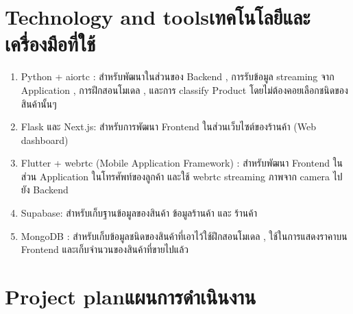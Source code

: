 \section{\ifenglish Technology and tools\else เทคโนโลยีและเครื่องมือที่ใช้\fi}
\begin{enumerate}
    \item Python + aiortc : สำหรับพัฒนาในส่วนของ Backend   , การรับข้อมูล streaming จาก Application   , การฝึกสอนโมเดล , และการ classify Product
    โดยไม่ต้องคอยเลือกชนิดของสินค้านั้นๆ
    \item Flask และ Next.js: สําหรับการพัฒนา Frontend ในส่วนเว็บไซต์ของร้านค้า (Web dashboard)
    \item Flutter + webrtc  (Mobile Application Framework) : สำหรับพัฒนา Frontend  ในส่วน Application ในโทรศัพท์ของลูกค้า และใช้ webrtc streaming ภาพจาก camera  ไปยัง Backend
    \item Supabase: สําหรับเก็บฐานข้อมูลของสินค้า ข้อมูลร้านค้า และ ร้านค้า
    \item MongoDB : สำหรับเก็บข้อมูลชนิดของสินค้าที่เอาไว้ใช้ฝึกสอนโมเดล , ใช้ในการแสดงราคาบน Frontend  และเก็บจำนวนของสินค้าที่ขายไปแล้ว

\end{enumerate}



\section{\ifenglish Project plan\else แผนการดำเนินงาน\fi}
    
